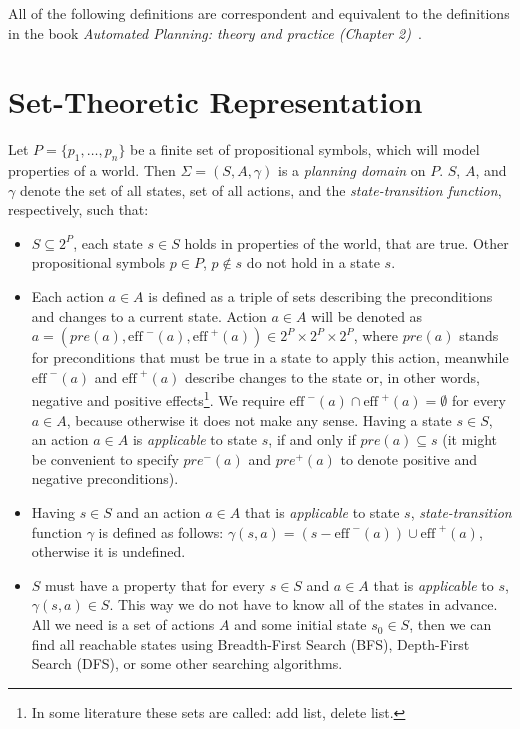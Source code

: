 \medskip\noindent
All of the following definitions are correspondent and equivalent to the definitions in the book \emph{Automated Planning: theory and practice (Chapter 2)}~\cite{nau}.

\section{Set-Theoretic Representation}

\begin{defn}\label{def01:1}
  Let $P = \{p_1,\dots,p_n\}$ be a finite set of propositional symbols, which will model properties of a world. Then $\Sigma = (S, A, \gamma)$ is a \emph{planning domain} on $P$. $S$, $A$, and $\gamma$ denote the set of all states, set of all actions, and the \emph{state-transition function}, respectively, such that:

  \begin{itemize}
      \item $S \subseteq 2^{P}$, each state $s \in S$ holds in properties of the world, that are true. Other propositional symbols $p \in P$, $p \notin s$ do not hold in a state $s$.
      
      \item Each action $a \in A$ is defined as a triple of sets describing the preconditions and changes to a current state. Action $a \in A$ will be denoted as \mbox{$a=(pre(a), \text{eff}^{\,\,-}(a), \text{eff}^{\,\,+}(a)) \in  2^{P} \times 2^{P} \times 2^{P}$}, where $pre(a)$ stands for preconditions that must be true in a state to apply this action, meanwhile $\text{eff}^{\,\,-}(a)$ and $\text{eff}^{\,\,+}(a)$ describe changes to the state or, in other words, negative and positive effects\footnote{In some literature these sets are called: add list, delete list.}. We require $\text{eff}^{\,\,-}(a) \cap \text{eff}^{\,\,+}(a) = \emptyset$ for every $a \in A$, because otherwise it does not make any sense. Having a state $s \in S$, an action $a \in A$ is \emph{applicable} to state $s$, if and only if $pre(a) \subseteq s$ (it might be convenient to specify $pre^{-}(a)$ and $pre^{+}(a)$ to denote positive and negative preconditions).
      
      \item Having $s \in S$ and an action $a \in A$ that is \emph{applicable} to state $s$, \emph{state-transition} function $\gamma$ is defined as follows: $\gamma(s,a)=(s-\text{eff}^{\,\,-}(a)) \cup \text{eff}^{\,\,+}(a)$, otherwise it is undefined.
      \item $S$ must have a property that for every $s \in S$ and $a \in A$ that is \emph{applicable} to $s$, $\gamma(s,a) \in S$. This way we do not have to know all of the states in advance. All we need is a set of actions $A$ and some initial state $s_0 \in S$, then we can find all reachable states using Breadth-First Search (BFS), Depth-First Search (DFS), or some other searching algorithms.
  \end{itemize}
\end{defn}

